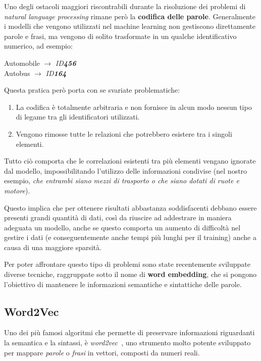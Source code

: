 \documentclass[12pt,a4paper,twoside,openright]{book}
\begin{document}
Uno degli ostacoli maggiori riscontrabili durante la risoluzione dei problemi di \emph{natural language processing} rimane però la \textbf{codifica delle parole}. Generalmente i modelli che vengono utilizzati nel machine learning non gestiscono direttamente parole e frasi, ma vengono di solito trasformate in un qualche identificativo numerico, ad esempio:
\begin{center}
    Automobile $\longrightarrow$ \emph{ID\textbf{456}}\\
    Autobus $\longrightarrow$ \emph{ID\textbf{164}}
\end{center}
Questa pratica però porta con se svariate problematiche:
\begin{enumerate}
    \item La codifica è totalmente arbitraria e non fornisce in alcun modo nessun tipo di legame tra gli identificatori utilizzati.
    \item Vengono rimosse tutte le relazioni che potrebbero esistere tra i singoli elementi.
\end{enumerate}
Tutto ciò comporta che le correlazioni esistenti tra più elementi vengano ignorate dal modello, impossibilitando l'utilizzo delle informazioni condivise (nel nostro esempio, \emph{che entrambi siano mezzi di trasporto o che siano dotati di ruote e motore}).

Questo implica che per ottenere risultati abbastanza soddisfacenti debbano essere presenti grandi quantità di dati, così da riuscire ad addestrare in maniera adeguata un modello, anche se questo comporta un aumento di difficoltà nel gestire i dati (e conseguentemente anche tempi più lunghi per il training) anche a causa di una maggiore sparsità.

Per poter affrontare questo tipo di problemi sono state recentemente sviluppate diverse tecniche, raggruppate sotto il nome di \textbf{word embedding}, che si pongono l'obiettivo di mantenere le informazioni semantiche e sintattiche delle parole.

\subsection{Word2Vec}

Uno dei più famosi algoritmi che permette di preservare informazioni riguardanti la semantica e la sintassi, è \emph{word2vec}~\cite{DBLP:conf/iclr/2013w}, uno strumento molto potente sviluppato per mappare \emph{parole} o \emph{frasi} in vettori, composti da numeri reali.
\end{document}
